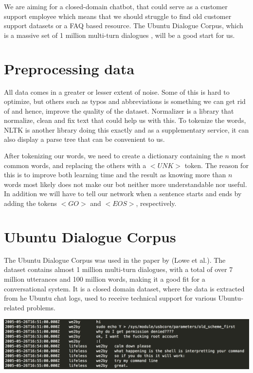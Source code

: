 \documentclass{article} %
\begin{document}
We are aiming for a closed-domain chatbot, that could serve as a customer support employee which means that we should struggle to find old customer support datasets or a FAQ based resource. The Ubuntu Dialogue Corpus, which is a massive set of 1 million multi-turn dialogues \cite{Lowe}, will be a good start for us.  %

\section{Preprocessing data}
All data comes in a greater or lesser extent of noise. Some of this is hard to optimize, but others such as typos and abbreviations is something we can get rid of and hence, improve the quality of the dataset. Normalizer \cite{Normalizer} is a library that normalize, clean and fix text that could help us with this. To tokenize the words, NLTK \cite{NLTK} is another library doing this exactly and as a supplementary service, it can also display a parse tree that can be convenient to us.

After tokenizing our words, we need to create a dictionary containing the $n$ most common words, and replacing the others with a $<UNK>$ token. The reason for this is to improve both learning time and the result as knowing more than $n$ words most likely does not make our bot neither more understandable nor useful. In addition we will have to tell our network when a sentence starts and ends by adding the tokens $<GO>$ and $<EOS>$, respectively.

\section{Ubuntu Dialogue Corpus}
The Ubuntu Dialogue Corpus was used in the paper by (Lowe et al.). The dataset contains almost 1 million multi-turn dialogues, with a total of over 7 million utterances and 100 million words, making it a good fit for a conversational system. It is a closed domain dataset, where the data is extracted from he Ubuntu chat logs, used to receive technical support for various Ubuntu-related problems. \cite{Lowe}

\includegraphics[scale=0.5]{tsv_file_example} \newline
\end{document}
